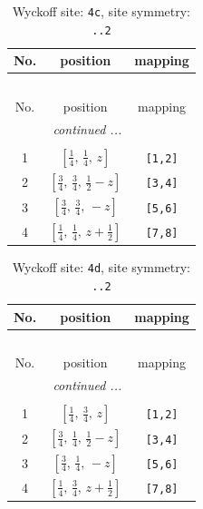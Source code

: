 \documentclass[fleqn,8pt]{jsarticle}
\begin{document}
\renewcommand{\arraystretch}{1.2}
\begin{longtable}{ccc}
\caption{Wyckoff site: {\tt 4c}, site symmetry: {\tt ..2}}
 \\
 \hline \hline
No. & position & mapping \\ \hline \endfirsthead

\multicolumn{2}{l}{\tablename\ \thetable{}} \\
 \hline \hline
No. & position & mapping \\ \hline \endhead

 \hline \hline
\multicolumn{2}{r}{\footnotesize\it continued ...} \\ \endfoot

 \hline \hline
\multicolumn{2}{r}{} \\ \endlastfoot

1 & $\left[ \frac{1}{4},\, \frac{1}{4},\, z \right]$ & {\tt [1,2]} \\ \hline
2 & $\left[ \frac{3}{4},\, \frac{3}{4},\, \frac{1}{2} - z \right]$ & {\tt [3,4]} \\ \hline
3 & $\left[ \frac{3}{4},\, \frac{3}{4},\, - z \right]$ & {\tt [5,6]} \\ \hline
4 & $\left[ \frac{1}{4},\, \frac{1}{4},\, z + \frac{1}{2} \right]$ & {\tt [7,8]} \\
\end{longtable}
\renewcommand{\arraystretch}{1.2}
\begin{longtable}{ccc}
\caption{Wyckoff site: {\tt 4d}, site symmetry: {\tt ..2}}
 \\
 \hline \hline
No. & position & mapping \\ \hline \endfirsthead

\multicolumn{2}{l}{\tablename\ \thetable{}} \\
 \hline \hline
No. & position & mapping \\ \hline \endhead

 \hline \hline
\multicolumn{2}{r}{\footnotesize\it continued ...} \\ \endfoot

 \hline \hline
\multicolumn{2}{r}{} \\ \endlastfoot

1 & $\left[ \frac{1}{4},\, \frac{3}{4},\, z \right]$ & {\tt [1,2]} \\ \hline
2 & $\left[ \frac{3}{4},\, \frac{1}{4},\, \frac{1}{2} - z \right]$ & {\tt [3,4]} \\ \hline
3 & $\left[ \frac{3}{4},\, \frac{1}{4},\, - z \right]$ & {\tt [5,6]} \\ \hline
4 & $\left[ \frac{1}{4},\, \frac{3}{4},\, z + \frac{1}{2} \right]$ & {\tt [7,8]} \\
\end{longtable}
\end{document}
